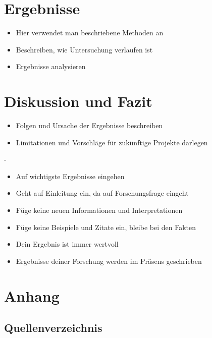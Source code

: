 \documentclass[a4paper,12pt,oneside]{article}
\begin{document}
  \section{Ergebnisse}
    \begin{itemize}
      \item Hier verwendet man beschriebene Methoden an
      \item Beschreiben, wie Untersuchung verlaufen ist
      \item Ergebnisse analysieren
    \end{itemize}
  \section{Diskussion und Fazit}
    \begin{itemize}
      \item Folgen und Ursache der Ergebnisse beschreiben
      \item Limitationen und Vorschläge für zukünftige Projekte darlegen
    \end{itemize}
    -
    \begin{itemize}
      \item Auf wichtigste Ergebnisse eingehen
      \item Geht auf Einleitung ein, da auf Forschungsfrage eingeht
      \item Füge keine neuen Informationen und Interpretationen
      \item Füge keine Beispiele und Zitate ein, bleibe bei den Fakten
      \item Dein Ergebnis ist immer wertvoll
      \item Ergebnisse deiner Forschung werden im Präsens geschrieben
    \end{itemize}
  \section{Anhang}
    \subsection{Quellenverzeichnis}
      \printbibliography
  
  \newpage
  \pagestyle{empty}
\end{document}
